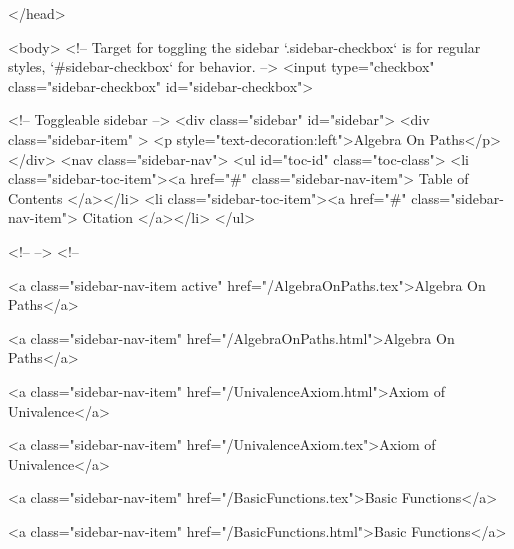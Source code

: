   
</head>




  <body>
    <!-- Target for toggling the sidebar `.sidebar-checkbox` is for regular
     styles, `#sidebar-checkbox` for behavior. -->
<input type="checkbox" class="sidebar-checkbox" id="sidebar-checkbox">

<!-- Toggleable sidebar -->
<div class="sidebar" id="sidebar">
  <div class="sidebar-item" >
    <p style="text-decoration:left">Algebra On Paths</p>
  </div>
  <nav class="sidebar-nav">
    <ul id="toc-id" class="toc-class">
  <li class="sidebar-toc-item"><a href="#" class="sidebar-nav-item"> Table of Contents </a></li>
  <li class="sidebar-toc-item"><a href="#" class="sidebar-nav-item"> Citation </a></li>
</ul>


    <!--  -->
    <!-- 
      
    
      
    
      
    
      
        
      
    
      
        
          <a class="sidebar-nav-item active" href="/AlgebraOnPaths.tex">Algebra On Paths</a>
        
      
    
      
        
          <a class="sidebar-nav-item" href="/AlgebraOnPaths.html">Algebra On Paths</a>
        
      
    
      
        
          <a class="sidebar-nav-item" href="/UnivalenceAxiom.html">Axiom of Univalence</a>
        
      
    
      
        
          <a class="sidebar-nav-item" href="/UnivalenceAxiom.tex">Axiom of Univalence</a>
        
      
    
      
        
          <a class="sidebar-nav-item" href="/BasicFunctions.tex">Basic Functions</a>
        
      
    
      
        
          <a class="sidebar-nav-item" href="/BasicFunctions.html">Basic Functions</a>
        
      
    
      
        
